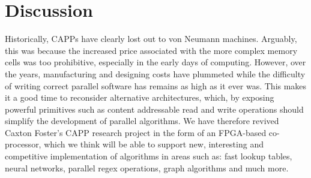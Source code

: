 \section{Discussion}
Historically, CAPPs have clearly lost out to von Neumann machines. Arguably, this was because the increased price associated with the more complex memory cells was too prohibitive, especially in the early days of computing. However, over the years, manufacturing and designing costs have plummeted while the difficulty of writing correct parallel software has remains as high as it ever was. This makes it a good time to reconsider alternative architectures, which, by exposing powerful primitives such as content addressable read and write operations should simplify the development of parallel algorithms. We have therefore revived Caxton Foster's CAPP research project in the form of an FPGA-based co-processor, which we think will be able to support new, interesting and competitive implementation of algorithms in areas such as: fast lookup tables, neural networks, parallel regex operations, graph algorithms and much more. 